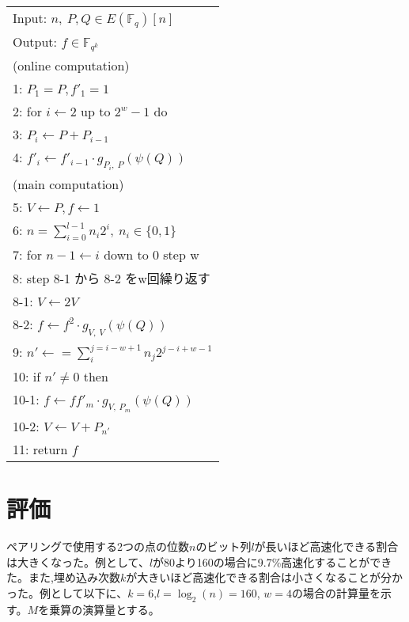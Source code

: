 \documentclass[twocolumn]{jsarticle} %
\begin{document}
\begin{longtable}
 \begin{center}
  \begin{tabular}{|l|}
     \hline
     Input: $n, \ P, Q \in E(\mathbb{F}_q)[n]$ \\
     Output: $f \in \mathbb{F}_{q^k}$  \\
     \hline
     (online computation) \\
     1: \quad $P_1 = P, f'_1=1 $\\
     2: \quad for $i \gets 2$ up to $2^w -1$ do\\
     3: \quad \quad $P_i \gets P + P_{i-1} $\\
     4: \quad \quad $f'_i \gets f'_{i-1} \cdot g_{P_i,\ P}(\psi (Q))$\\

     (main computation) \\
     5: \quad $V \gets P, f \gets 1 $\\
     6: \quad $n=\sum^{l - 1}_{i=0} n_i 2^i, \ n_i \in \{0,1\}$\\

     7: \quad for $ n-1 \gets i$ down to 0 step w\\
     8: \quad step 8-1 から 8-2 をw回繰り返す\\
     8-1: \quad \quad $V \gets 2V $\\
     8-2: \quad \quad $f \gets f^2 \cdot g_{V,\ V}(\psi (Q))$\\

     9: \quad $n' \gets =\sum^{j=i-w+1}_{i} n_{j}2^{j-i+w-1} $\\
     10: \quad if $n' \neq 0$ then\\
     10-1: \quad \quad $f \gets ff'_m \cdot g_{V,\ P_m}(\psi (Q))$ \\
     10-2: \quad \quad $V \gets V + P_{n'} $\\
     11: \quad return $f$\\
     \hline
  \end{tabular}
 \end{center}
\end{longtable}

\section{評価}
ペアリングで使用する2つの点の位数$n$のビット列$l$が長いほど高速化できる割合は大きくなった。例として、$l$が80より160の場合に9.7\%高速化することができた。また,埋め込み次数$k$が大きいほど高速化できる割合は小さくなることが分かった。例として以下に、$k=6$,$l=\log_2(n)=160$, $w=4$の場合の計算量を示す。$M$を乗算の演算量とする。
\end{document}
